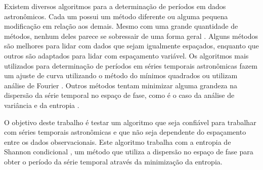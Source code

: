Existem diversos algoritmos para a determinação de períodos em dados astronômicos. Cada um possui um método diferente ou alguma pequena modificação em relação aos demais. Mesmo com uma grande quantidade de métodos, nenhum deles parece se sobressair de uma forma geral \citep{comparison}. Alguns métodos são melhores para lidar com dados que sejam igualmente espaçados, enquanto que outros são adaptados para lidar com espaçamento variável. Os algoritmos mais utilizados para determinação de períodos em séries temporais astronômicas fazem um ajuste de curva utilizando o método do mínimos quadrados \citep{lomb} ou utilizam análise de Fourier \citep{mello81}. Outros métodos tentam minimizar alguma grandeza na dispersão da série temporal no espa\c{c}o de fase, como é o caso da análise de variância \citep{aov} e da entropia \citep{entropy}.



O objetivo deste trabalho é testar um algoritmo que seja confiável para trabalhar com séries temporais astronômicas e que não seja dependente do espaçamento entre os dados observacionais. Este algoritmo trabalha com a entropia de Shannon condicional \citep{ce, Cincotta1999}, um método que utiliza a dispersão no espaço de fase para obter o período da série temporal através da minimização da entropia.



